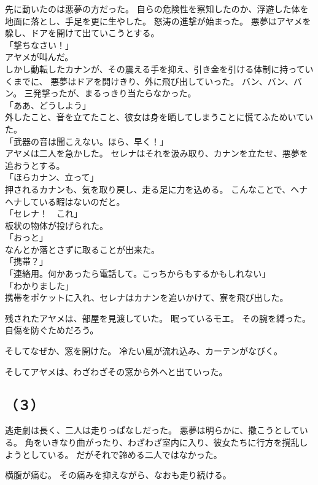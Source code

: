 \documentclass[../IHMain]{subfiles}
\begin{document}
先に動いたのは悪夢の方だった。
自らの危険性を察知したのか、浮遊した体を地面に落とし、手足を更に生やした。
怒涛の進撃が始まった。
悪夢はアヤメを躱し、ドアを開けて出ていこうとする。\\
「撃ちなさい！」\\
アヤメが叫んだ。\\
しかし動転したカナンが、その震える手を抑え、引き金を引ける体制に持っていくまでに、
悪夢はドアを開けきり、外に飛び出していった。
バン、バン、バン。
三発撃ったが、まるっきり当たらなかった。\\
「ああ、どうしよう」\\
外したこと、音を立てたこと、彼女は身を晒してしまうことに慌てふためいていた。\\
「武器の音は聞こえない。ほら、早く！」\\
アヤメは二人を急かした。
セレナはそれを汲み取り、カナンを立たせ、悪夢を追おうとする。\\
「ほらカナン、立って」\\
押されるカナンも、気を取り戻し、走る足に力を込める。
こんなことで、ヘナヘナしている暇はないのだと。\\
「セレナ！　これ」\\
板状の物体が投げられた。\\
「おっと」\\
なんとか落とさずに取ることが出来た。\\
「携帯？」\\
「連絡用。何かあったら電話して。こっちからもするかもしれない」\\
「わかりました」\\
携帯をポケットに入れ、セレナはカナンを追いかけて、寮を飛び出した。

残されたアヤメは、部屋を見渡していた。
眠っているモエ。
その腕を縛った。
自傷を防ぐためだろう。

そしてなぜか、窓を開けた。
冷たい風が流れ込み、カーテンがなびく。

そしてアヤメは、わざわざその窓から外へと出ていった。

\subsection*{（３）}
逃走劇は長く、二人は走りっぱなしだった。
悪夢は明らかに、撒こうとしている。
角をいきなり曲がったり、わざわざ室内に入り、彼女たちに行方を撹乱しようとしている。
だがそれで諦める二人ではなかった。

横腹が痛む。
その痛みを抑えながら、なおも走り続ける。
\end{document}
